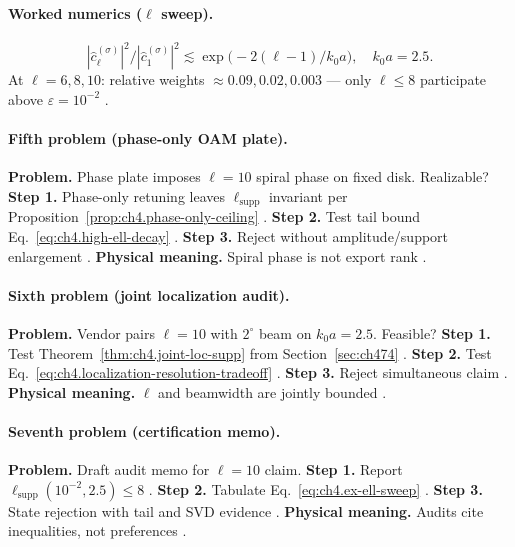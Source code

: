 \paragraph{Worked numerics (\(\ell\) sweep).}
\begin{equation}
\label{eq:ch4.ex-ell-sweep}
|\widehat{c}_{\ell}^{(\sigma)}|^{2}/|\widehat{c}_{1}^{(\sigma)}|^{2}\lesssim\exp\!\bigl(-2(\ell-1)/k_{0}a\bigr),\quad k_{0}a=2.5.
\end{equation}
At \(\ell=6,8,10\): relative weights \(\approx0.09,0.02,0.003\) --- only \(\ell\le8\) participate above \(\varepsilon=10^{-2}\) \cite{hansen1988,jackson1999,harrington2001,devaney2004,stratton1941}.

\paragraph{Fifth problem (phase-only OAM plate).}
\textbf{Problem.} Phase plate imposes \(\ell=10\) spiral phase on fixed disk. Realizable?
\textbf{Step 1.} Phase-only retuning leaves \(\ell_{\mathrm{supp}}\) invariant per Proposition~\ref{prop:ch4.phase-only-ceiling} \cite{stratton1941,harrington2001}.
\textbf{Step 2.} Test tail bound Eq.~\eqref{eq:ch4.high-ell-decay} \cite{hansen1988,jackson1999}.
\textbf{Step 3.} Reject without amplitude/support enlargement \cite{devaney2004,stratton1941}.
\textbf{Physical meaning.} Spiral phase is not export rank \cite{harrington2001,hansen1988}.

\paragraph{Sixth problem (joint localization audit).}
\textbf{Problem.} Vendor pairs \(\ell=10\) with \(2^{\circ}\) beam on \(k_{0}a=2.5\). Feasible?
\textbf{Step 1.} Test Theorem~\ref{thm:ch4.joint-loc-supp} from Section~\ref{sec:ch474} \cite{hansen1988,harrington2001}.
\textbf{Step 2.} Test Eq.~\eqref{eq:ch4.localization-resolution-tradeoff} \cite{jackson1999,stratton1941}.
\textbf{Step 3.} Reject simultaneous claim \cite{devaney2004,hansen1988}.
\textbf{Physical meaning.} \(\ell\) and beamwidth are jointly bounded \cite{harrington2001,stratton1941}.

\paragraph{Seventh problem (certification memo).}
\textbf{Problem.} Draft audit memo for \(\ell=10\) claim.
\textbf{Step 1.} Report \(\ell_{\mathrm{supp}}(10^{-2},2.5)\le8\) \cite{hansen1988,harrington2001}.
\textbf{Step 2.} Tabulate Eq.~\eqref{eq:ch4.ex-ell-sweep} \cite{jackson1999,stratton1941}.
\textbf{Step 3.} State rejection with tail and SVD evidence \cite{devaney2004,hansen1988}.
\textbf{Physical meaning.} Audits cite inequalities, not preferences \cite{stratton1941,harrington2001}.

